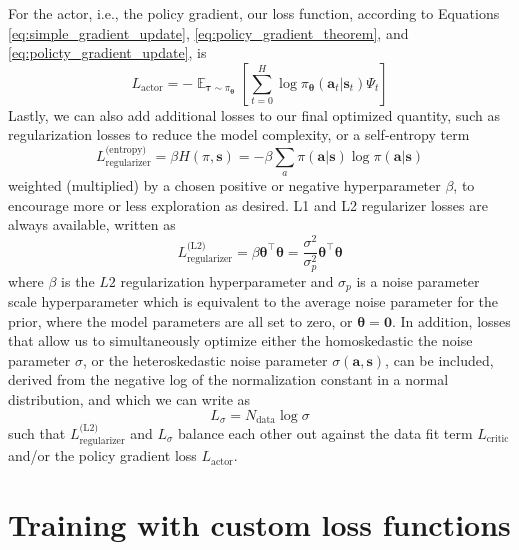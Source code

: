 \documentclass{article}
\begin{document}
For the actor, i.e., the policy gradient, our loss function, according to Equations  \ref{eq:simple_gradient_update}, \ref{eq:policy_gradient_theorem}, and \ref{eq:policty_gradient_update}, is \begin{equation}L_\text{actor}=-\mathop{\mathbb{E}}_{\boldsymbol{\tau}\sim\pi_{\boldsymbol{\theta}}}\left[\sum_{t=0}^H\log\pi_{\boldsymbol{\theta}}(\mathbf{a}_t|\mathbf{s}_t)\Psi_t\right]\end{equation} Lastly, we can also add additional losses to our final optimized quantity, such as regularization losses to reduce the model complexity, or a self-entropy term \begin{equation}L_\text{regularizer}^\text{(entropy)}=\beta H(\pi, \mathbf{s})=-\beta \sum_a\pi(\mathbf{a}|\mathbf{s})\log\pi(\mathbf{a}|\mathbf{s})\end{equation} weighted (multiplied) by a chosen positive or negative hyperparameter $\beta$, to encourage more or less exploration as desired.  L1 and L2 regularizer losses are always available, written as \begin{equation}L_\text{regularizer}^{\text{(L2)}}=\beta\boldsymbol{\theta}^\top\boldsymbol{\theta}=\frac{\sigma^2}{\sigma_p^2}\boldsymbol{\theta}^\top\boldsymbol{\theta}\end{equation} where $\beta$ is the $L2$ regularization hyperparameter and $\sigma_p$ is a noise parameter scale hyperparameter which is equivalent to the average noise parameter for the prior, where the model parameters are all set to zero, or $\boldsymbol{\theta}=\mathbf{0}$. In addition, losses that allow us to simultaneously optimize either the homoskedastic the noise parameter $\sigma$, or the heteroskedastic noise parameter $\sigma(\mathbf{a},\mathbf{s})$, can be included, derived from the negative log of the normalization constant in a normal distribution, and which we can write as \begin{equation}L_\sigma=N_\text{data}\log\sigma\end{equation}such that $L_\text{regularizer}^\text{(L2)}$ and $L_\sigma$ balance each other out against the data fit term $L_\text{critic}$ and/or the policy gradient loss $L_\text{actor}$.

\section{Training with custom loss functions}
\end{document}
